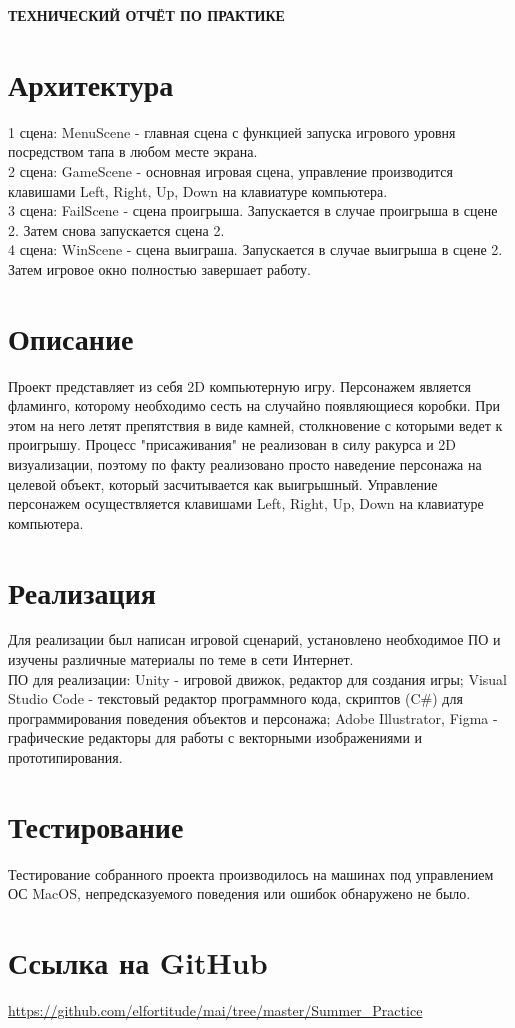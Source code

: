 \begin{center}
\bfseries{\large ТЕХНИЧЕСКИЙ ОТЧЁТ ПО ПРАКТИКЕ}
\end{center}

\section*{Архитектура}
1 сцена: MenuScene - главная сцена с функцией запуска игрового уровня посредством тапа в любом месте экрана. \\
2 сцена: GameScene - основная игровая сцена, управление производится клавишами Left, Right, Up, Down на клавиатуре компьютера. \\
3 сцена: FailScene - сцена проигрыша. Запускается в случае проигрыша в сцене 2. Затем снова запускается сцена 2. \\
4 сцена: WinScene - сцена выиграша. Запускается в случае выигрыша в сцене 2. Затем игровое окно полностью завершает работу.
\section*{Описание}
Проект представляет из себя 2D компьютерную игру. Персонажем является фламинго, которому необходимо сесть на случайно появляющиеся коробки. При этом на него летят препятствия в виде камней, столкновение с которыми ведет к проигрышу. Процесс "присаживания" не реализован в силу ракурса и 2D визуализации, поэтому по факту реализовано просто наведение персонажа на целевой объект, который засчитывается как выигрышный. Управление персонажем осуществляется клавишами Left, Right, Up, Down на клавиатуре компьютера.
\section*{Реализация}
Для реализации был написан игровой сценарий, установлено необходимое ПО и изучены различные материалы по теме в сети Интернет. \\
ПО для реализации: Unity - игровой движок, редактор для создания игры; Visual Studio Code - текстовый редактор программного кода, скриптов (C#) для программирования поведения объектов и персонажа; Adobe Illustrator, Figma - графические редакторы для работы с векторными изображениями и прототипирования.
\section*{Тестирование}
Тестирование собранного проекта производилось на машинах под управлением ОС MacOS, непредсказуемого поведения или ошибок обнаружено не было.
\section*{Ссылка на GitHub}
\href{https://github.com/elfortitude/mai/tree/master/Summer_Practice}{https://github.com/elfortitude/mai/tree/master/Summer\_Practice}
\pagebreak